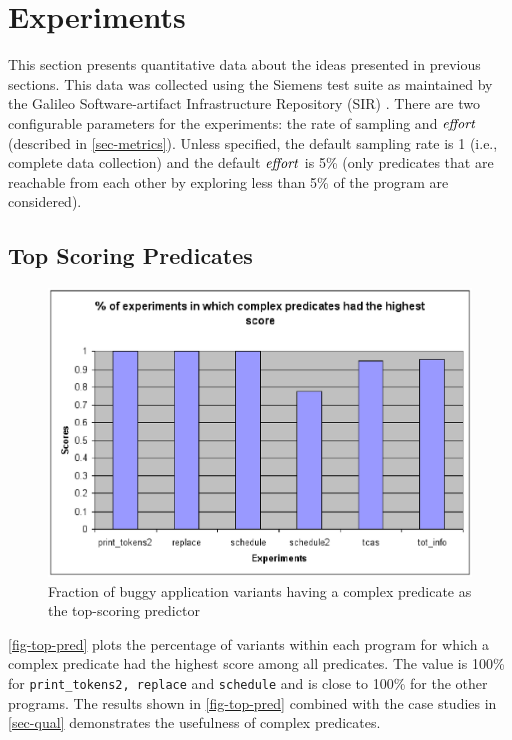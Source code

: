 
\section{Experiments}

This section presents quantitative data about the ideas presented in previous sections.  This data was collected using the Siemens test suite \cite{257766} as maintained by the Galileo Software-artifact Infrastructure Repository (SIR) \cite{Do05,SAI}.  There are two configurable parameters for the experiments: the rate of sampling and $\mathit{effort}$ (described in \autoref{sec-metrics}).  Unless specified, the default sampling rate is 1 (i.e., complete data collection) and the default $\mathit{effort}$ is 5\% (only predicates that are reachable from each other by exploring less than 5\% of the program are considered).

\subsection{Top Scoring Predicates}

\label{sec-quant}
\begin{figure}
  \centering
  \includegraphics{charts/top-pred}
  \caption{Fraction of buggy application variants having a complex predicate as the top-scoring predictor}
  \label{fig-top-pred}
\end{figure}

\autoref{fig-top-pred} plots the percentage of variants within each program for which a complex predicate had the highest score among all predicates.  The value is 100\% for \texttt{print\_tokens2, replace} and \texttt{schedule} and is close to 100\% for the other programs.  The results shown in \autoref{fig-top-pred} combined with the case studies in \autoref{sec-qual} demonstrates the usefulness of complex predicates.

